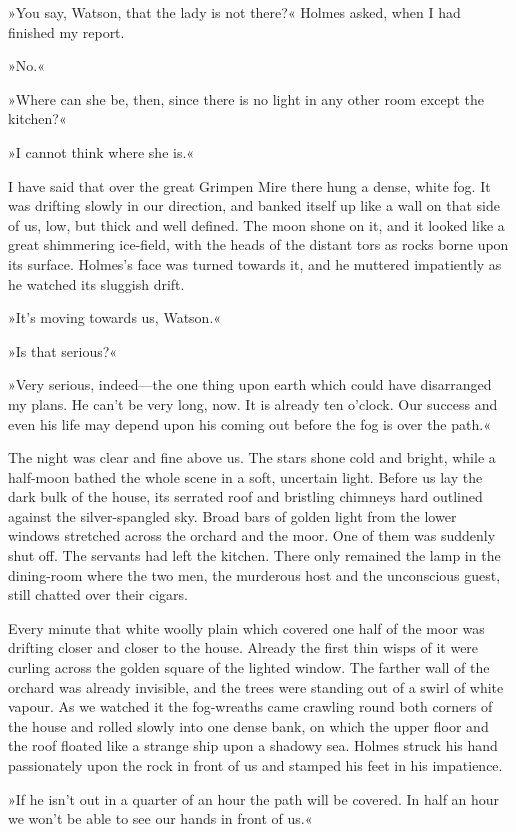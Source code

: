 »You say, Watson, that the lady is not there?« Holmes asked, when I had finished my report.

»No.«

»Where can she be, then, since there is no light in any other room except the kitchen?«

»I cannot think where she is.«

I have said that over the great Grimpen Mire there hung a dense, white fog. It was drifting slowly in our direction, and banked itself up like a wall on that side of us, low, but thick and well defined. The moon shone on it, and it looked like a great shimmering ice-field, with the heads of the distant tors as rocks borne upon its surface. Holmes's face was turned towards it, and he muttered impatiently as he watched its sluggish drift.

»It's moving towards us, Watson.«

»Is that serious?«

»Very serious, indeed—the one thing upon earth which could have disarranged my plans. He can't be very long, now. It is already ten o'clock. Our success and even his life may depend upon his coming out before the fog is over the path.«

The night was clear and fine above us. The stars shone cold and bright, while a half-moon bathed the whole scene in a soft, uncertain light. Before us lay the dark bulk of the house, its serrated roof and bristling chimneys hard outlined against the silver-spangled sky. Broad bars of golden light from the lower windows stretched across the orchard and the moor. One of them was suddenly shut off. The servants had left the kitchen. There only remained the lamp in the dining-room where the two men, the murderous host and the unconscious guest, still chatted over their cigars.

Every minute that white woolly plain which covered one half of the moor was drifting closer and closer to the house. Already the first thin wisps of it were curling across the golden square of the lighted window. The farther wall of the orchard was already invisible, and the trees were standing out of a swirl of white vapour. As we watched it the fog-wreaths came crawling round both corners of the house and rolled slowly into one dense bank, on which the upper floor and the roof floated like a strange ship upon a shadowy sea. Holmes struck his hand passionately upon the rock in front of us and stamped his feet in his impatience.

»If he isn't out in a quarter of an hour the path will be covered. In half an hour we won't be able to see our hands in front of us.«

